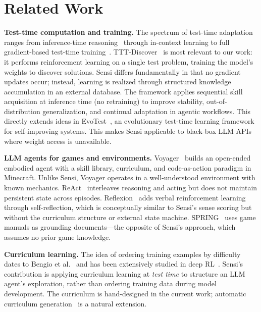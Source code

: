 \documentclass[11pt,letterpaper]{article}
\begin{document}
\section{Related Work}
\label{sec:related}

\textbf{Test-time computation and training.} The spectrum of test-time adaptation ranges from inference-time reasoning~\citep{wei2022chain,wang2023selfconsistency} through in-context learning to full gradient-based test-time training~\citep{sun2024learning,yuksekgonul2025tttdiscover}. TTT-Discover~\citep{yuksekgonul2025tttdiscover} is most relevant to our work: it performs reinforcement learning on a single test problem, training the model's weights to discover solutions. Sensi differs fundamentally in that no gradient updates occur; instead, learning is realized through structured knowledge accumulation in an external database. The framework applies sequential skill acquisition at inference time (no retraining) to improve stability, out-of-distribution generalization, and continual adaptation in agentic workflows. This directly extends ideas in EvoTest~\citep{he2025evotest}, an evolutionary test-time learning framework for self-improving systems. This makes Sensi applicable to black-box LLM APIs where weight access is unavailable.

\textbf{LLM agents for games and environments.} Voyager~\citep{wang2024voyager} builds an open-ended embodied agent with a skill library, curriculum, and code-as-action paradigm in Minecraft. Unlike Sensi, Voyager operates in a well-understood environment with known mechanics. ReAct~\citep{yao2023react} interleaves reasoning and acting but does not maintain persistent state across episodes. Reflexion~\citep{shinn2024reflexion} adds verbal reinforcement learning through self-reflection, which is conceptually similar to Sensi's sense scoring but without the curriculum structure or external state machine. SPRING~\citep{wu2024spring} uses game manuals as grounding documents---the opposite of Sensi's approach, which assumes no prior game knowledge.

\textbf{Curriculum learning.} The idea of ordering training examples by difficulty dates to Bengio et al.~\citep{bengio2009curriculum} and has been extensively studied in deep RL~\citep{portelas2020automatic}. Sensi's contribution is applying curriculum learning at \emph{test time} to structure an LLM agent's exploration, rather than ordering training data during model development. The curriculum is hand-designed in the current work; automatic curriculum generation~\citep{portelas2020automatic} is a natural extension.
\end{document}
